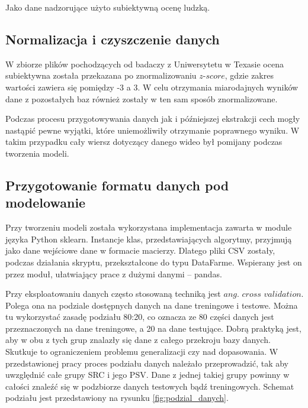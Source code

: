 Jako dane nadzorujące użyto subiektywną ocenę ludzką.\par

\subsection{Normalizacja i czyszczenie danych}
W zbiorze plików pochodzących od badaczy z Uniwersytetu w Texasie ocena subiektywna została przekazana po znormalizowaniu $z$-$score$, gdzie zakres wartości zawiera się pomiędzy -3 a 3. W celu otrzymania miarodajnych wyników dane z pozostałych baz również zostały w ten sam sposób znormalizowane.\par
Podczas procesu przygotowywania danych jak i późniejszej ekstrakcji cech mogły nastąpić pewne wyjątki, które uniemożliwiły otrzymanie poprawnego wyniku. W takim przypadku cały wiersz dotyczący danego wideo był pomijany podczas tworzenia modeli.

\subsection{Przygotowanie formatu danych pod modelowanie}

Przy tworzeniu modeli została wykorzystana implementacja zawarta w module języka Python sklearn. Instancje klas, przedstawiających algorytmy, przyjmują jako dane wejściowe dane w formacie macierzy. Dlatego pliki CSV zostały, podczas działania skryptu, przekształcone do typu DataFarme. Wspierany jest on przez moduł, ułatwiający prace z dużymi danymi -- pandas.\par

Przy eksploatowaniu danych często stosowaną techniką jest $ang.$ $cross$ $validation$. Polega ona na podziale dostępnych danych na dane treningowe i testowe. Można tu wykorzystać zasadę podziału 80:20, co oznacza ze 80 części danych jest przeznaczonych na dane treningowe, a 20 na dane testujące. Dobrą praktyką jest, aby w obu z tych grup znalazły się dane z całego przekroju bazy danych. Skutkuje to ograniczeniem problemu generalizacji czy nad dopasowania. W przedstawionej pracy proces podziału danych należało przeprowadzić, tak aby uwzględnić  całe grupy SRC i jego PSV. Dane z jednej takiej grupy powinny w całości znaleźć się w podzbiorze danych testowych bądź treningowych. Schemat podziału jest przedstawiony na rysunku \ref{fig:podzial_danych}.

